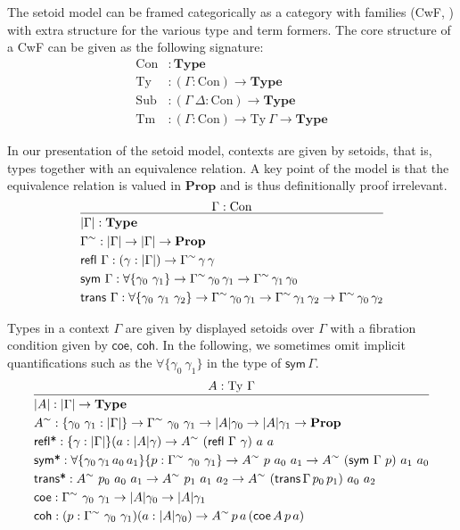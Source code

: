 \documentclass[autoref]{llncs}
\newcommand{\GG}{\Gamma}
\newcommand{\GD}{\Delta}
\newcommand{\mType}{\mathbf{Type}}
\newcommand{\mProp}{\mathbf{Prop}}
\newcommand{\Con}{\mathrm{Con}}
\newcommand{\Ty}{\mathrm{Ty}}
\newcommand{\Tm}{\mathrm{Tm}}
\newcommand{\Sub}{\mathrm{Sub}}
\begin{document}
The setoid model can be framed categorically as a category with families (CwF,
\cite{internal-tt}) with extra structure for the various type and term
formers. The core structure of a CwF can be given as the following signature:
\vspace{-0.2em}
\begin{align*}
  \Con &: \mType \\
  \Ty &: (\GG : \Con) \to \mType \\
  \Sub &: (\GG\ \GD : \Con) \to \mType \\
  \Tm &: (\GG : \Con) \to \Ty\ \GG \to \mType
\end{align*}

In our presentation of the setoid model, contexts are given by setoids, that is,
types together with an equivalence relation. A key point of the model is that the
equivalence relation is valued in $\mProp$ and is thus definitionally proof
irrelevant.
\[
\infer{
  \begin{aligned}
    & | \GG | : \mType \\
    & \GG^\sim : | \GG | \to | \GG | \to \mProp \\
    & \textsf{refl}\ \GG : (\gamma : | \GG |) \to \GG^\sim\,\gamma\,\gamma \\
    & \textsf{sym} \ \GG : \forall\{\gamma_0\ \gamma_1\} \to \GG^\sim\,\gamma_0\,\gamma_1
    \to \GG^\sim\,\gamma_1\,\gamma_0 \\
    & \textsf{trans} \ \GG : \forall\{\gamma_0\ \gamma_1\ \gamma_2\}
    \to \GG^\sim\,\gamma_0\,\gamma_1
    \to \GG^\sim\,\gamma_1\,\gamma_2
    \to \GG^\sim\,\gamma_0\,\gamma_2
  \end{aligned}
}{
  \GG : \Con
}
\]

Types in a context $\GG$ are given by displayed setoids over $\GG$
with a fibration condition given by $\textsf{coe}$, $\textsf{coh}$. In
the following, we sometimes omit implicit quantifications such as the $\forall\{\gamma_0\ \gamma_1\}$ in the type of $\textsf{sym}\,\GG$.
\[
\infer{
  \begin{aligned}
    & | A | : | \GG | \to \mType \\
    & A^\sim : \{\gamma_0\ \gamma_1 : | \GG |\}
    \to \GG^\sim\ \gamma_0\ \gamma_1 \to | A | \gamma_0 \to | A | \gamma_1 \to \mProp \\
    & \textsf{refl*} : \{\gamma : | \GG | \} (a : | A | \gamma) \to A^\sim\ (\textsf{refl}\ \GG\ \gamma)\ a\ a \\
    & \textsf{sym*} : \forall\{\gamma_0\,\gamma_1\,a_0\,a_1\}\{p : \GG^\sim\ \gamma_0\ \gamma_1\}
    \to A^\sim\ p\ a_0\ a_1 \to A^\sim\ (\textsf{sym}\ \GG\ p)\ a_1\ a_0 \\
    & \textsf{trans*} : A^\sim\ p_0\ a_0\ a_1\to A^\sim\ p_1\ a_1\ a_2\to A^\sim\ (\textsf{trans}\,\GG\,p_0\,p_1)\ a_0\ a_2\\
    & \textsf{coe} : \GG^\sim\ \gamma_0\ \gamma_1 \to | A | \gamma_0 \to | A | \gamma_1 \\
    & \textsf{coh} : (p : \GG^\sim\ \gamma_0\ \gamma_1) (a : | A | \gamma_0)
    \to A^\sim\,p\,a\,(\textsf{coe}\,A\,p\,a) \\
  \end{aligned}
}{
  A : \Ty\ \GG
}
\]
\end{document}
